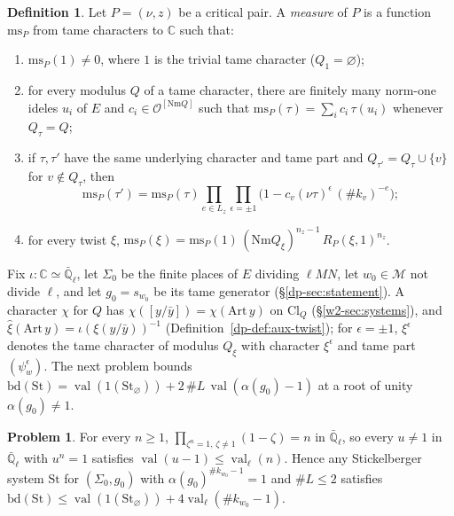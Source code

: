 \documentclass[reqno]{amsart}
\theoremstyle{definition}
\newtheorem{problem}{Problem}[section]
\newtheorem{definition}{Definition}[section]
\theoremstyle{plain}
\theoremstyle{remark}
\newcommand{\C}{\mathbb{C}}
\newcommand{\Ql}{\bar{\mathbb{Q}}_\ell}
\newcommand{\Oc}{\mathcal{O}}
\newcommand{\Mcal}{\mathcal{M}}
\newcommand{\St}{\mathrm{St}}
\newcommand{\bd}{\mathrm{bd}}
\newcommand{\ms}{\mathrm{ms}}
\newcommand{\Cl}{\mathrm{Cl}}
\newcommand{\Nm}{\mathrm{Nm}}
\newcommand{\val}{\operatorname{val}}
\begin{document}
\begin{definition}\label{def:measure}
Let \(P = (\nu, z)\) be a critical pair.  A \emph{measure} of \(P\) is a function \(\ms_P\) from tame characters to \(\C\) such that:
\begin{enumerate}
\item \(\ms_P(1) \ne 0\), where \(1\) is the trivial tame character (\(Q_1 = \varnothing\));
\item for every modulus \(Q\) of a tame character, there are finitely many norm-one ideles \(u_i\) of \(E\) and \(c_i \in \Oc^{[\Nm Q]}\) such that \(\ms_P(\tau) = \sum_i c_i\,\tau(u_i)\) whenever \(Q_\tau = Q\);
\item if \(\tau, \tau'\) have the same underlying character and tame part and \(Q_{\tau'} = Q_\tau \cup \{v\}\) for \(v \notin Q_\tau\), then
\[
  \ms_P(\tau') = \ms_P(\tau) \prod_{e \in L_z} \prod_{\epsilon = \pm 1} \bigl(1 - c_v(\nu\tau)^{\epsilon}\,(\#k_v)^{-e}\bigr) ;
\]
\item for every twist \(\xi\), \(\ms_P(\xi) = \ms_P(1)\,(\Nm Q_\xi)^{n_z - 1}\,R_P(\xi, 1)^{n_z}\).
\end{enumerate}
\end{definition}

Fix \(\iota \colon \C \simeq \Ql\), let \(\Sigma_0\) be the finite places of \(E\) dividing \(\ell MN\), let \(w_0 \in \Mcal\) not divide \(\ell\), and let \(g_0 = s_{w_0}\) be its tame generator (\S\ref{dp-sec:statement}).  A character \(\chi\) for \(Q\) has \(\chi([y/\bar y]) = \chi(\mathrm{Art}\,y)\) on \(\Cl_Q\) (\S\ref{w2-sec:systems}), and \(\hat\xi(\mathrm{Art}\,y) = \iota(\xi(y/\bar y))^{-1}\) (Definition~\ref{dp-def:aux-twist}); for \(\epsilon = \pm 1\), \(\xi^{\epsilon}\) denotes the tame character of modulus \(Q_\xi\) with character \(\xi^{\epsilon}\) and tame part \((\psi_w^{\epsilon})\).  The next problem bounds \(\bd(\St) = \val(1(\St_\varnothing)) + 2\,\#L\,\val(\alpha(g_0) - 1)\) at a root of unity \(\alpha(g_0) \ne 1\).

\begin{problem}\label{pr:root-val}
For every \(n \ge 1\), \(\prod_{\zeta^n = 1,\, \zeta \ne 1} (1 - \zeta) = n\) in \(\Ql\), so every \(u \ne 1\) in \(\Ql\) with \(u^n = 1\) satisfies \(\val(u - 1) \le \val_\ell(n)\).  Hence any Stickelberger system \(\St\) for \((\Sigma_0, g_0)\) with \(\alpha(g_0)^{\#k_{w_0} - 1} = 1\) and \(\#L \le 2\) satisfies \(\bd(\St) \le \val(1(\St_\varnothing)) + 4\val_\ell(\#k_{w_0} - 1)\).
\end{problem}
\end{document}
